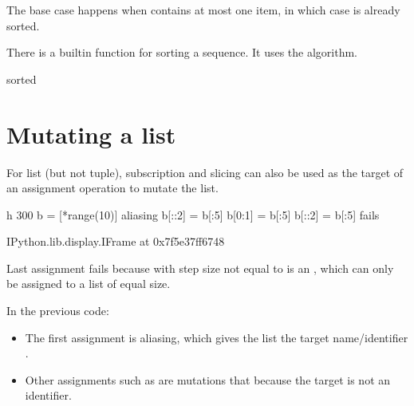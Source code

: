 \documentclass[letterpaper,10pt,english]{sphinxmanual}
\begin{document}
The base case happens when  contains at most one item, in which case  is already sorted.

There is a built\sphinxhyphen{}in function  for sorting a sequence. It uses the  algorithm.

\begin{sphinxVerbatim}[commandchars=\\\{\}]
sorted
\end{sphinxVerbatim}

\begin{sphinxVerbatim}[commandchars=\\\{\}]
[22, 22, 32, 39, 58, 63, 73, 76, 79, 93]
\end{sphinxVerbatim}


\section{Mutating a list}
\label{\detokenize{Lecture7/Lists and Tuples:mutating-a-list}}
For list (but not tuple), subscription and slicing can also be used as the target of an assignment operation to mutate the list.

\begin{sphinxVerbatim}[commandchars=\\\{\}]
 \PYGZhy{}h 300
b = [*range(10)]  \PYGZsh{} aliasing
b[::2] = b[:5]
b[0:1] = b[:5]
b[::2] = b[:5]  \PYGZsh{} fails
\end{sphinxVerbatim}

\begin{sphinxVerbatim}[commandchars=\\\{\}]
\PYGZlt{}IPython.lib.display.IFrame at 0x7f5e37ff6748\PYGZgt{}
\end{sphinxVerbatim}

Last assignment fails because \sphinxcode{\sphinxupquote{{[}::2{]}}} with step size not equal to  is an , which can only be assigned to a list of equal size.


In the previous code:
\begin{itemize}
\item {} 
The first assignment  is aliasing, which gives the list the target name/identifier .

\item {} 
Other assignments such as  are mutations that  because the target  is not an identifier.

\end{itemize}
\end{document}
